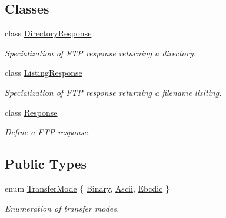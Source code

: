 \subsection*{Classes}
\begin{DoxyCompactItemize}
\item 
class \hyperlink{classsf_1_1_ftp_1_1_directory_response}{Directory\-Response}
\begin{DoxyCompactList}\small\item\em Specialization of F\-T\-P response returning a directory. \end{DoxyCompactList}\item 
class \hyperlink{classsf_1_1_ftp_1_1_listing_response}{Listing\-Response}
\begin{DoxyCompactList}\small\item\em Specialization of F\-T\-P response returning a filename lisiting. \end{DoxyCompactList}\item 
class \hyperlink{classsf_1_1_ftp_1_1_response}{Response}
\begin{DoxyCompactList}\small\item\em Define a F\-T\-P response. \end{DoxyCompactList}\end{DoxyCompactItemize}
\subsection*{Public Types}
\begin{DoxyCompactItemize}
\item 
enum \hyperlink{classsf_1_1_ftp_a1cd6b89ad23253f6d97e6d4ca4d558cb}{Transfer\-Mode} \{ \hyperlink{classsf_1_1_ftp_a1cd6b89ad23253f6d97e6d4ca4d558cba6f253b362639fb5e059dc292762a21ee}{Binary}, 
\hyperlink{classsf_1_1_ftp_a1cd6b89ad23253f6d97e6d4ca4d558cbac9e544a22dce8ef3177449cb235d15c2}{Ascii}, 
\hyperlink{classsf_1_1_ftp_a1cd6b89ad23253f6d97e6d4ca4d558cbabb1e34435231e73c96534c71090be7f4}{Ebcdic}
 \}
\begin{DoxyCompactList}\small\item\em Enumeration of transfer modes. \end{DoxyCompactList}\end{DoxyCompactItemize}
